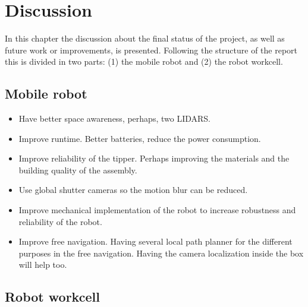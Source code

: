 \chapter{Discussion}
\label{chap:discussion}
In this chapter the discussion about the final status of the project, as well as future work or improvements, is presented.
Following the structure of the report this is divided in two parts: (1) the mobile robot and (2) the robot workcell.

	\section{Mobile robot} %
	\label{sub:mobile_robot}

	\begin{itemize}
		\item Have better space awareness, perhaps, two LIDARS.
		\item Improve runtime. Better batteries, reduce the power consumption.
		\item Improve reliability of the tipper. Perhaps improving the materials and the building quality of the assembly.
		\item Use global shutter cameras so the motion blur can be reduced.
		\item Improve mechanical implementation of the robot to increase robustness and reliability of the robot.
		\item Improve free navigation. Having several local path planner for the different purposes in the free navigation. Having the camera localization inside the box will help too.
	\end{itemize}

	\section{Robot workcell} %
	\label{sub:robot_workcell}

